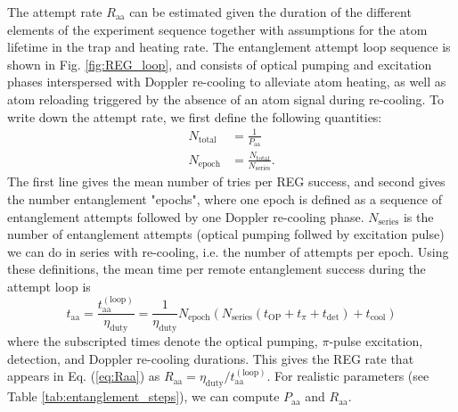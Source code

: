 The attempt rate $R_{\text{aa}}$ can be estimated given the duration of the different elements of the experiment sequence together with assumptions for the atom lifetime in the trap and heating rate. The entanglement attempt loop sequence is shown in Fig. \ref{fig:REG_loop}, and consists of optical pumping and excitation phases interspersed with Doppler re-cooling to alleviate atom heating, as well as atom reloading triggered by the absence of an atom signal during re-cooling. To write down the attempt rate, we first define the following quantities:
\begin{align}
    N_{\text{total}} &= \frac{1}{P_{\text{aa}}} \\
    N_{\text{epoch}} &= \frac{N_{\text{total}}}{N_{\text{series}}}.
\end{align}
The first line gives the mean number of tries per REG success, and second gives the number entanglement "epochs", where one epoch is defined as a sequence of entanglement attempts followed by one Doppler re-cooling phase. $N_{\text{series}}$ is the number of entanglement attempts (optical pumping follwed by excitation pulse) we can do in series with re-cooling, i.e. the number of attempts per epoch. Using these definitions, the mean time per remote entanglement success during the attempt loop is 
\begin{equation}
    t_{\text{aa}}=\frac{t_{\text{aa}}^{(\text{loop})}}{\eta_{\text{duty}}}=\frac{1}{\eta_{\text{duty}}}N_{\text{epoch}}\left(N_{\text{series}}\left(t_{\text{OP}} + t_{\pi} + t_{\text{det}}\right) + t_{\text{cool}}\right)
\end{equation}
where the subscripted times denote the optical pumping, $\pi$-pulse excitation, detection, and Doppler re-cooling durations. This gives the REG rate that appears in Eq. (\ref{eq:Raa}) as $R_{\text{aa}} = \eta_{\text{duty}}/t_{\text{aa}}^{(\text{loop})}$. For realistic parameters (see Table \ref{tab:entanglement_steps}), we can compute $P_{\text{aa}}$ and $R_{\text{aa}}$.
